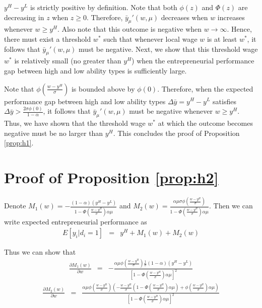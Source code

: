 \documentclass[letterpaper,12pt]{article}
\begin{document}
$y^{H}-y^{L}$ is strictly positive by definition. Note that both $\phi(z)$ and $\Phi(z)$ are decreasing in $z$ when $z\geq 0$. Therefore, $\bar{y}_{\mu}'(w,\mu)$ decreases when $w$ increases whenever $w\geq y^{H}$. Also note that this outcome is negative when $w\to\infty$. Hence, there must exist a threshold $w^{*}$ such that whenever local wage $w$ is at least $w^{*}$, it follows that $\bar{y}_{\mu}'(w,\mu)$ must be negative. Next, we show that this threshold wage $w^{*}$ is relatively small (no greater than $y^{H}$) when the entrepreneurial performance gap between high and low ability types is sufficiently large.

Note that $\phi\left(\frac{w-y^{H}}{\sigma}\right)$ is bounded above by $\phi(0)$. Therefore, when the expected performance gap between high and low ability types $\Delta\bar{y}=y^{H}-y^{L}$ satisfies $\Delta\bar{y}> \frac{2\sigma\phi(0)}{1-\alpha}$, it follows that $\bar{y}_{\mu}'(w,\mu)$ must be negative whenever $w\geq y^{H}$. Thus, we have shown that the threshold wage $w^{*}$ at which the outcome becomes negative must be no larger than $y^{H}$. This concludes the proof of Proposition \ref{prop:h1}.

\section{Proof of Proposition \ref{prop:h2}}

Denote $M_1(w) = -\frac{(1-\alpha)(y^{H}-y^{L})}{1-\Phi\left(\frac{w-y^{H}}{\sigma}\right)\alpha\mu}$ and $M_2(w) = \frac{\alpha\mu\sigma\phi\left(\frac{w-y^{H}}{\sigma}\right)}{1-\Phi\left(\frac{w-y^{H}}{\sigma}\right)\alpha\mu}$. Then we can write expected entrepreneurial performance as
\begin{eqnarray}
E\left[y_{i}\vert d_{i}=1\right] &=& y^{H} + M_1(w) + M_2(w)
\end{eqnarray}

Thus we can show that
\begin{eqnarray}
    \frac{\partial M_1(w)}{\partial w} &=& -\frac{\alpha\mu\phi\left(\frac{w-y^{H}}{\sigma}\right)\frac{1}{\sigma}(1-\alpha)(y^{H}-y^{L})}{\left[1-\Phi\left(\frac{w-y^{H}}{\sigma}\right)\alpha\mu\right]^{2}}
\end{eqnarray}
\begin{eqnarray}
    \frac{\partial M_2(w)}{\partial w} &=& \frac{\alpha\mu\phi\left(\frac{w-y^{H}}{\sigma}\right)\left(-\frac{w-y^{H}}{\sigma}\left(1-\Phi\left(\frac{w-y^{H}}{\sigma}\right)\alpha\mu\right)+\phi\left(\frac{w-y^{H}}{\sigma}\right)\alpha\mu\right)}{\left[1-\Phi\left(\frac{w-y^{H}}{\sigma}\right)\alpha\mu\right]^{2}}
\end{eqnarray}
\end{document}

